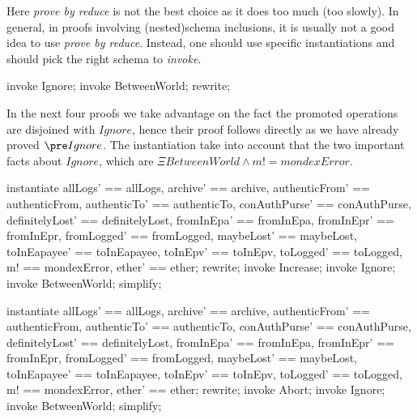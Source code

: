 Here \textit{prove by reduce} is not the best choice as it does too
much (too slowly). In general, in proofs involving (nested)schema
inclusions, it is usually not a good idea to use \textit{prove by
reduce}. Instead, one should use specific instantiations and should
pick the right schema to \textit{invoke}.
%
\begin{LPScript}\begin{zproof}[tBetwIgnoreIsTotal]
    invoke Ignore;
    invoke \Xi BetweenWorld;
    rewrite;
\end{zproof}\end{LPScript}

In the next four proofs we take advantage on the fact the promoted
operations are disjoined with $Ignore$, hence their proof follows
directly as we have already proved $\pre Ignore$. The instantiation
take into account that the two important facts about $Ignore$, which
are $\Xi BetweenWorld \land m! = mondexError$.
%
\begin{LPScript}\begin{zproof}[tBetwIncreaseIsTotal]
    instantiate
      allLogs' == allLogs, archive' == archive,
      authenticFrom' == authenticFrom, authenticTo' == authenticTo,
      conAuthPurse' == conAuthPurse, definitelyLost' == definitelyLost,
      fromInEpa' == fromInEpa, fromInEpr' == fromInEpr,
      fromLogged' == fromLogged, maybeLost' == maybeLost,
      toInEapayee' == toInEapayee, toInEpv' == toInEpv,
      toLogged' == toLogged, m! == mondexError, ether' == ether;
    rewrite;
    invoke Increase;
    invoke Ignore;
    invoke \Xi BetweenWorld;
    simplify;
\end{zproof}\end{LPScript}

\begin{LPScript}\begin{zproof}[tBetwAbortIsTotal]
   instantiate
      allLogs' == allLogs, archive' == archive,
      authenticFrom' == authenticFrom, authenticTo' == authenticTo,
      conAuthPurse' == conAuthPurse, definitelyLost' == definitelyLost,
      fromInEpa' == fromInEpa, fromInEpr' == fromInEpr,
      fromLogged' == fromLogged, maybeLost' == maybeLost,
      toInEapayee' == toInEapayee, toInEpv' == toInEpv,
      toLogged' == toLogged, m! == mondexError, ether' == ether;
    rewrite;
    invoke Abort;
    invoke Ignore;
    invoke \Xi BetweenWorld;
    simplify;
\end{zproof}\end{LPScript}


